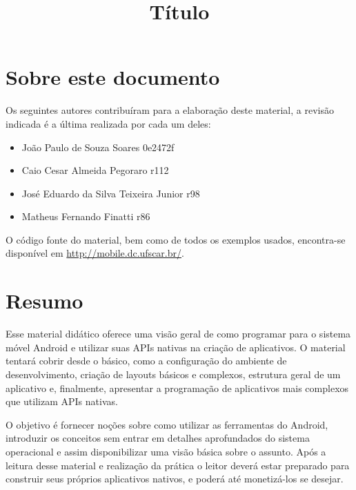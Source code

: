 \documentclass[a4paper,12pt,brazil,oneside]{book}
\title{Título}
\begin{document}



\cleardoublepage

\onehalfspace

\pagestyle{plain}


\chapter*{Sobre este documento}
Os seguintes autores contribuíram para a elaboração deste material, a revisão indicada é a última realizada por cada um deles:
  \begin{itemize}
	\item João Paulo de Souza Soares \dotfill 0e2472f
	\item Caio Cesar Almeida Pegoraro \dotfill r112
	\item José Eduardo da Silva Teixeira Junior \dotfill r98
    \item Matheus Fernando Finatti \dotfill r86
  \end{itemize}
O código fonte do material, bem como de todos os exemplos usados, encontra-se disponível em \href{http://mobile.dc.ufscar.br/}{http://mobile.dc.ufscar.br/}.
\thispagestyle{empty}

\chapter*{Resumo}

\doublespace
Esse material didático oferece uma visão geral de como programar para o sistema móvel Android e utilizar suas APIs nativas na criação de aplicativos. O material tentará cobrir desde o básico, como a configuração do ambiente de desenvolvimento, criação de layouts básicos e complexos, estrutura geral de um aplicativo e, finalmente, apresentar a programação de aplicativos mais complexos que utilizam APIs nativas.

O objetivo é fornecer noções sobre como utilizar as ferramentas do Android, introduzir os conceitos sem entrar em detalhes aprofundados do sistema operacional e assim disponibilizar uma visão básica sobre o assunto.
Após a leitura desse material e realização da prática o leitor deverá estar preparado para construir seus próprios aplicativos nativos, e poderá até monetizá-los se desejar.


\setcounter{tocdepth}{1} %
\end{document}
